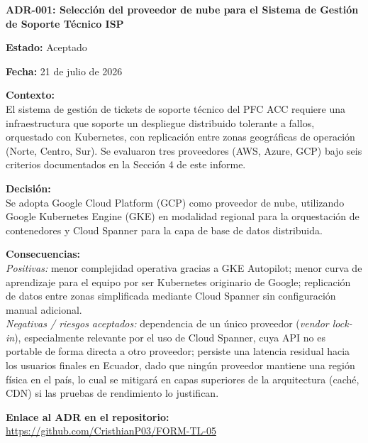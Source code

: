 \documentclass[12pt, a4paper]{article}
\begin{document}
\begin{mdframed}[backgroundcolor=grisClaro, linecolor=azulUTEQ, linewidth=1pt]
\small
\textbf{ADR-001: Selección del proveedor de nube para el Sistema de Gestión de Soporte Técnico ISP}

\vspace{4pt}
\textbf{Estado:} Aceptado

\vspace{4pt}
\textbf{Fecha:} 21 de julio de 2026

\vspace{4pt}
\textbf{Contexto:}\\
El sistema de gestión de tickets de soporte técnico del PFC ACC requiere una infraestructura que soporte un despliegue distribuido tolerante a fallos, orquestado con Kubernetes, con replicación entre zonas geográficas de operación (Norte, Centro, Sur). Se evaluaron tres proveedores (AWS, Azure, GCP) bajo seis criterios documentados en la Sección 4 de este informe.

\vspace{4pt}
\textbf{Decisión:}\\
Se adopta Google Cloud Platform (GCP) como proveedor de nube, utilizando Google Kubernetes Engine (GKE) en modalidad regional para la orquestación de contenedores y Cloud Spanner para la capa de base de datos distribuida.

\vspace{4pt}
\textbf{Consecuencias:}\\
\textit{Positivas:} menor complejidad operativa gracias a GKE Autopilot; menor curva de aprendizaje para el equipo por ser Kubernetes originario de Google; replicación de datos entre zonas simplificada mediante Cloud Spanner sin configuración manual adicional.\\[4pt]
\textit{Negativas / riesgos aceptados:} dependencia de un único proveedor (\textit{vendor lock-in}), especialmente relevante por el uso de Cloud Spanner, cuya API no es portable de forma directa a otro proveedor; persiste una latencia residual hacia los usuarios finales en Ecuador, dado que ningún proveedor mantiene una región física en el país, lo cual se mitigará en capas superiores de la arquitectura (caché, CDN) si las pruebas de rendimiento lo justifican.

\vspace{4pt}
\textbf{Enlace al ADR en el repositorio:}\\
\url{https://github.com/CristhianP03/FORM-TL-05}
\end{mdframed}
\end{document}
